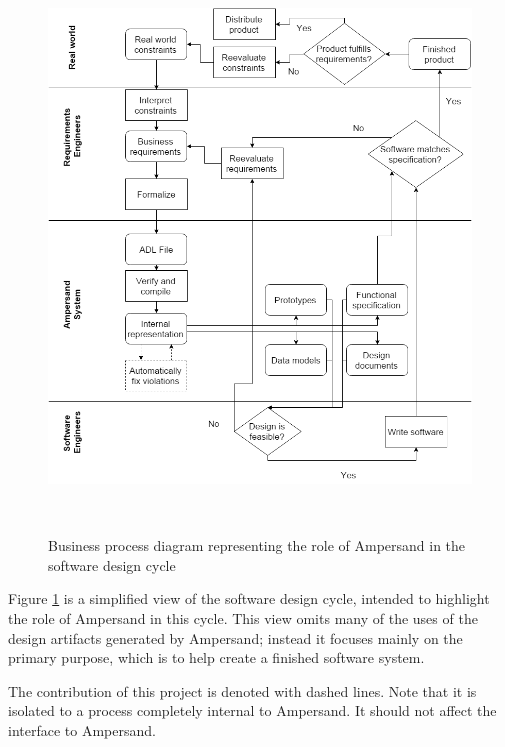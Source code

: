 \documentclass[12pt]{report}
\begin{document}
\begin{figure}[!htb]
\begin{center}
\includegraphics[width=\textwidth]{../figures/business_process}
\caption{Business process diagram representing the role of Ampersand in the
  software design cycle}~\label{fig:BusinessProcess}
\end{center}
\end{figure}


%

Figure \ref{fig:BusinessProcess} is a simplified view of the software design
cycle, intended to highlight the role of Ampersand in this cycle. This view
omits many of the uses of the design artifacts generated by Ampersand; instead
it focuses mainly on the primary purpose, which is to help create a finished
software system. 

The contribution of this project is denoted with dashed lines. Note that it is
isolated to a process completely internal to Ampersand. It should not affect the
interface to Ampersand.
\end{document}
